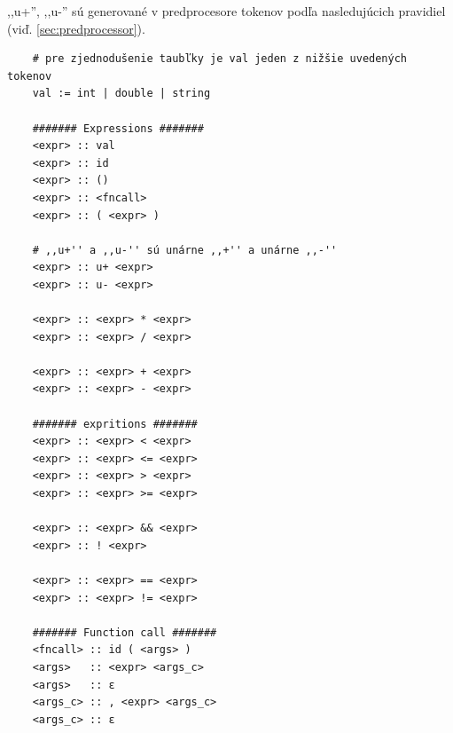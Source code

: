 \documentclass[11pt,a4paper]{article}
\begin{document}
  ,,u+'', ,,u-'' sú generované v predprocesore tokenov podľa
  nasledujúcich pravidiel (viď. \ref{sec:predprocessor}).

  \begin{verbatim}
    # pre zjednodušenie taubľky je val jeden z nižšie uvedených tokenov
    val := int | double | string

    ####### Expressions #######
    <expr> :: val
    <expr> :: id
    <expr> :: ()
    <expr> :: <fncall>
    <expr> :: ( <expr> )

    # ,,u+'' a ,,u-'' sú unárne ,,+'' a unárne ,,-''
    <expr> :: u+ <expr>
    <expr> :: u- <expr>

    <expr> :: <expr> * <expr>
    <expr> :: <expr> / <expr>

    <expr> :: <expr> + <expr>
    <expr> :: <expr> - <expr>

    ####### expritions #######
    <expr> :: <expr> < <expr>
    <expr> :: <expr> <= <expr>
    <expr> :: <expr> > <expr>
    <expr> :: <expr> >= <expr>
    
    <expr> :: <expr> && <expr>
    <expr> :: ! <expr>

    <expr> :: <expr> == <expr>
    <expr> :: <expr> != <expr>

    ####### Function call #######
    <fncall> :: id ( <args> )
    <args>   :: <expr> <args_c>
    <args>   :: ε
    <args_c> :: , <expr> <args_c>
    <args_c> :: ε
  \end{verbatim}
\end{document}
